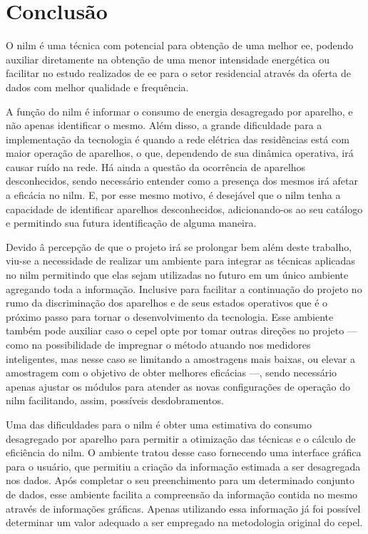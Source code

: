 \chapter{Conclusão}
\label{chap:conclusao}

O \acs{nilm} é uma técnica com potencial para obtenção de uma melhor
\acs{ee}, podendo auxiliar diretamente na obtenção de uma menor
intensidade energética ou facilitar no estudo realizados de \acs{ee}
para o setor residencial através da oferta de dados com melhor
qualidade e frequência.

A função do \acs{nilm} é informar o consumo de energia desagregado por
aparelho, e não apenas identificar o mesmo. Além disso, a grande
dificuldade para a implementação da tecnologia é quando a rede
elétrica das residências está com maior operação de aparelhos, o que,
dependendo de sua dinâmica operativa, irá causar ruído na rede.  Há
ainda a questão da ocorrência de aparelhos desconhecidos, sendo
necessário entender como a presença dos mesmos irá afetar a eficácia
no \acs{nilm}. E, por esse mesmo motivo, é desejável que o \acs{nilm}
tenha a capacidade de identificar aparelhos desconhecidos,
adicionando-os ao seu catálogo e permitindo sua futura identificação
de alguma maneira.

Devido â percepção de que o projeto irá se prolongar bem além deste
trabalho, viu-se a necessidade de realizar um ambiente para integrar
as técnicas aplicadas no \acs{nilm} permitindo que elas sejam
utilizadas no futuro em um único ambiente agregando toda a informação.
Inclusive para facilitar a continuação do projeto no rumo da
discriminação dos aparelhos e de seus estados operativos que é o
próximo passo para tornar o desenvolvimento da tecnologia.
Esse ambiente também pode auxiliar caso o \acs{cepel} opte por tomar
outras direções no projeto --- como na possibilidade de impregnar o
método atuando nos medidores inteligentes, mas nesse caso se limitando
a amostragens mais baixas, ou elevar a amostragem com o objetivo de
obter melhores eficácias ---, sendo necessário apenas ajustar os
módulos para atender as novas configurações de operação do \acs{nilm}
facilitando, assim, possíveis desdobramentos. 

Uma das dificuldades para o \acs{nilm} é obter uma estimativa do
consumo desagregado por aparelho para permitir a otimização das
técnicas e o cálculo de eficiência do \acs{nilm}. O ambiente tratou
desse caso fornecendo uma interface gráfica para o usuário, que
permitiu a criação da informação estimada a ser desagregada nos dados.
Após completar o seu preenchimento para um determinado conjunto de
dados, esse ambiente facilita a compreensão da informação contida no
mesmo através de informações gráficas. Apenas utilizando essa
informação já foi possível determinar um valor adequado a ser
empregado na metodologia original do \acs{cepel}.

